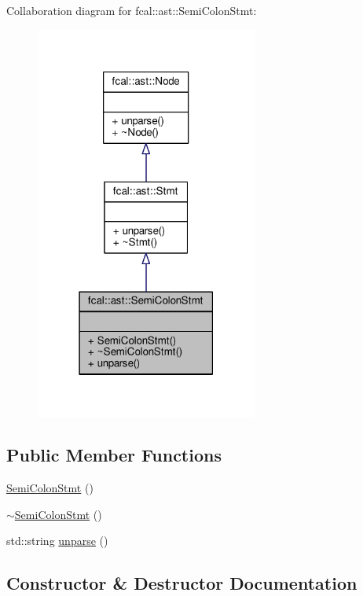 Collaboration diagram for fcal\+:\+:ast\+:\+:Semi\+Colon\+Stmt\+:
\nopagebreak
\begin{figure}[H]
\begin{center}
\leavevmode
\includegraphics[width=207pt]{classfcal_1_1ast_1_1SemiColonStmt__coll__graph}
\end{center}
\end{figure}
\subsection*{Public Member Functions}
\begin{DoxyCompactItemize}
\item 
\hyperlink{classfcal_1_1ast_1_1SemiColonStmt_aabc54dafad30c2cca34b5a7d236698d9}{Semi\+Colon\+Stmt} ()
\item 
\hyperlink{classfcal_1_1ast_1_1SemiColonStmt_af08833e93c870d51d6947d49aa6ba6fc}{$\sim$\+Semi\+Colon\+Stmt} ()
\item 
std\+::string \hyperlink{classfcal_1_1ast_1_1SemiColonStmt_a8da5ab111a4506ada995205a64a260a4}{unparse} ()
\end{DoxyCompactItemize}


\subsection{Constructor \& Destructor Documentation}
